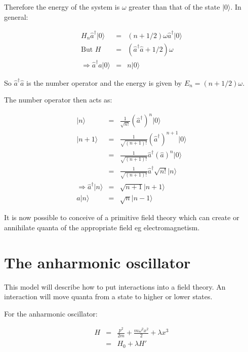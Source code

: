 Therefore the energy of the system is $\omega$ greater than that of the state $|0\rangle$.  In general:

\begin{eqnarray*}
  H_n\hat{a}^{\dagger}|0\rangle & = & \left(n + 1/2\right)\omega\hat{a}^{\dagger}|0\rangle \\
  \textrm{But }H & = & \left( \hat{a}^{\dagger}\hat{a} + 1/2\right)\omega \\
  \Rightarrow \hat{a}^{\dagger}\hat{a}|0\rangle & = & n|0\rangle
\end{eqnarray*}

So $\hat{a}^{\dagger}\hat{a}$ is the number operator and the energy is given by $E_n = (n + 1/2)\omega$.

The number operator then acts as:

\begin{eqnarray*}
  |n\rangle   & = & \frac{1}{\sqrt{n!}}\left(\hat{a}^{\dagger}\right)^n|0\rangle \\
  |n+1\rangle & = & \frac{1}{\sqrt{(n+1)!}}\left(\hat{a}^{\dagger}\right)^{n+1}|0\rangle \\
              & = & \frac{1}{\sqrt{(n+1)!}}\hat{a}^{\dagger}\left(\hat{a}\right)^n|0\rangle \\
              & = & \frac{1}{\sqrt{(n+1)!}}\hat{a}^{\dagger}\sqrt{n!}|n\rangle \\
  \Rightarrow \hat{a}^{\dagger}|n\rangle & = & \sqrt{n+1}|n+1\rangle \\
  \hat{a}|n\rangle & = & \sqrt{n}|n-1\rangle
\end{eqnarray*}

It is now possible to conceive of a primitive field theory which can create or annihilate quanta of the appropriate field eg electromagnetism.

\section{The anharmonic oscillator}

This model will describe how to put interactions into a field theory.  An interaction will move quanta from a state to higher or lower states.

For the anharmonic oscillator:

\begin{eqnarray*}
  H & = & \frac{p^2}{2m} + \frac{m\omega^2 x^2}{2} + \lambda x^3 \\
    & = & H_0 + \lambda H'
\end{eqnarray*}

